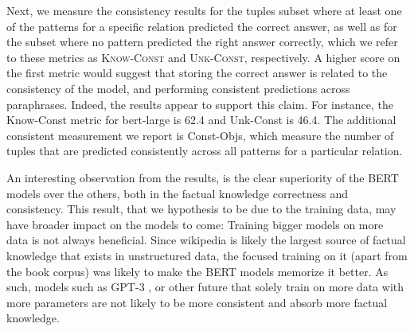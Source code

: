 Next, we measure the consistency results for the tuples subset where at least one of the patterns for a specific relation predicted the correct answer, as well as for the subset where no pattern predicted the right answer correctly, which we refer to these metrics as \textsc{Know-Const} and \textsc{Unk-Const}, respectively.
A higher score on the first metric would suggest that storing the correct answer is related to the consistency of the model, and performing consistent predictions across paraphrases.
Indeed, the results appear to support this claim. For instance, the Know-Const metric for bert-large is 62.4 and Unk-Const is 46.4. 
The additional consistent measurement we report is Const-Objs, which measure the number of tuples that are predicted consistently across all patterns for a particular relation.






An interesting observation from the results, is the clear superiority of the BERT models over the others, both in the factual knowledge correctness and consistency. This result, that we hypothesis to be due to the training data, may have broader impact on the models to come: Training bigger models on more data is not always beneficial. Since wikipedia is likely the largest source of factual knowledge that exists in unstructured data, the focused training on it (apart from the book corpus) was likely to make the BERT models memorize it better.
As such, models such as GPT-3 \cite{gpt3}, or other future that solely train on more data with more parameters are not likely to be more consistent and absorb more factual knowledge.
